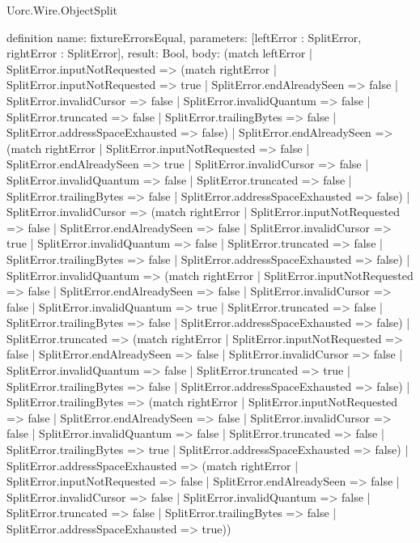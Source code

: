 \begin{lexlean}{Uorc.Wire.ObjectSplit}
\begin{semanticmodule}
definition{
  name: fixtureErrorsEqual,
  parameters: [leftError : SplitError, rightError : SplitError],
  result: Bool,
  body: (match leftError
    | SplitError.inputNotRequested => (match rightError
      | SplitError.inputNotRequested => true
      | SplitError.endAlreadySeen => false
      | SplitError.invalidCursor => false
      | SplitError.invalidQuantum => false
      | SplitError.truncated => false
      | SplitError.trailingBytes => false
      | SplitError.addressSpaceExhausted => false)
    | SplitError.endAlreadySeen => (match rightError
      | SplitError.inputNotRequested => false
      | SplitError.endAlreadySeen => true
      | SplitError.invalidCursor => false
      | SplitError.invalidQuantum => false
      | SplitError.truncated => false
      | SplitError.trailingBytes => false
      | SplitError.addressSpaceExhausted => false)
    | SplitError.invalidCursor => (match rightError
      | SplitError.inputNotRequested => false
      | SplitError.endAlreadySeen => false
      | SplitError.invalidCursor => true
      | SplitError.invalidQuantum => false
      | SplitError.truncated => false
      | SplitError.trailingBytes => false
      | SplitError.addressSpaceExhausted => false)
    | SplitError.invalidQuantum => (match rightError
      | SplitError.inputNotRequested => false
      | SplitError.endAlreadySeen => false
      | SplitError.invalidCursor => false
      | SplitError.invalidQuantum => true
      | SplitError.truncated => false
      | SplitError.trailingBytes => false
      | SplitError.addressSpaceExhausted => false)
    | SplitError.truncated => (match rightError
      | SplitError.inputNotRequested => false
      | SplitError.endAlreadySeen => false
      | SplitError.invalidCursor => false
      | SplitError.invalidQuantum => false
      | SplitError.truncated => true
      | SplitError.trailingBytes => false
      | SplitError.addressSpaceExhausted => false)
    | SplitError.trailingBytes => (match rightError
      | SplitError.inputNotRequested => false
      | SplitError.endAlreadySeen => false
      | SplitError.invalidCursor => false
      | SplitError.invalidQuantum => false
      | SplitError.truncated => false
      | SplitError.trailingBytes => true
      | SplitError.addressSpaceExhausted => false)
    | SplitError.addressSpaceExhausted => (match rightError
      | SplitError.inputNotRequested => false
      | SplitError.endAlreadySeen => false
      | SplitError.invalidCursor => false
      | SplitError.invalidQuantum => false
      | SplitError.truncated => false
      | SplitError.trailingBytes => false
      | SplitError.addressSpaceExhausted => true))
}


\end{semanticmodule}
\end{lexlean}
